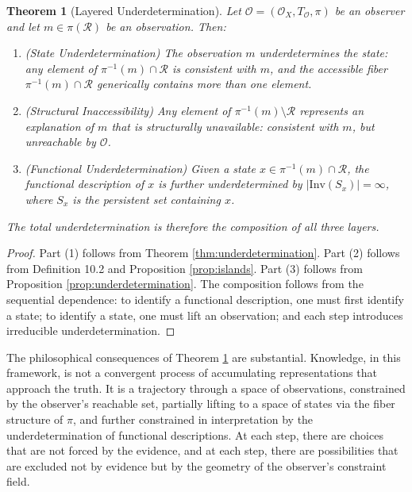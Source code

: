 \documentclass[12pt, a4paper, oneside]{article}
\theoremstyle{plain}
\newtheorem{theorem}{Theorem}[section]
\theoremstyle{definition}
\theoremstyle{remark}
\newcommand{\Obs}{\mathcal{O}}
\newcommand{\R}{\mathcal{R}}
\newcommand{\T}{T}
\newcommand{\proj}{\pi}
\begin{document}
\begin{theorem}[Layered Underdetermination]
\label{thm:layered}
Let $\Obs = (\Obs_X, \T_\Obs, \proj)$ be an observer and let $m \in \proj(\R)$ be an observation. Then:

\begin{enumerate}
\item \emph{(State Underdetermination)} The observation $m$ underdetermines the state: any element of $\proj^{-1}(m) \cap \R$ is consistent with $m$, and the accessible fiber $\proj^{-1}(m) \cap \R$ generically contains more than one element.

\item \emph{(Structural Inaccessibility)} Any element of $\proj^{-1}(m) \setminus \R$ represents an explanation of $m$ that is structurally unavailable: consistent with $m$, but unreachable by $\Obs$.

\item \emph{(Functional Underdetermination)} Given a state $x \in \proj^{-1}(m) \cap \R$, the functional description of $x$ is further underdetermined by $|\mathrm{Inv}(S_x)| = \infty$, where $S_x$ is the persistent set containing $x$.
\end{enumerate}

The total underdetermination is therefore the composition of all three layers.
\end{theorem}

\begin{proof}
Part (1) follows from Theorem \ref{thm:underdetermination}. Part (2) follows from Definition 10.2 and Proposition \ref{prop:islands}. Part (3) follows from Proposition \ref{prop:underdetermination}. The composition follows from the sequential dependence: to identify a functional description, one must first identify a state; to identify a state, one must lift an observation; and each step introduces irreducible underdetermination.
\end{proof}

The philosophical consequences of Theorem \ref{thm:layered} are substantial. Knowledge, in this framework, is not a convergent process of accumulating representations that approach the truth. It is a trajectory through a space of observations, constrained by the observer's reachable set, partially lifting to a space of states via the fiber structure of $\proj$, and further constrained in interpretation by the underdetermination of functional descriptions. At each step, there are choices that are not forced by the evidence, and at each step, there are possibilities that are excluded not by evidence but by the geometry of the observer's constraint field.
\end{document}

